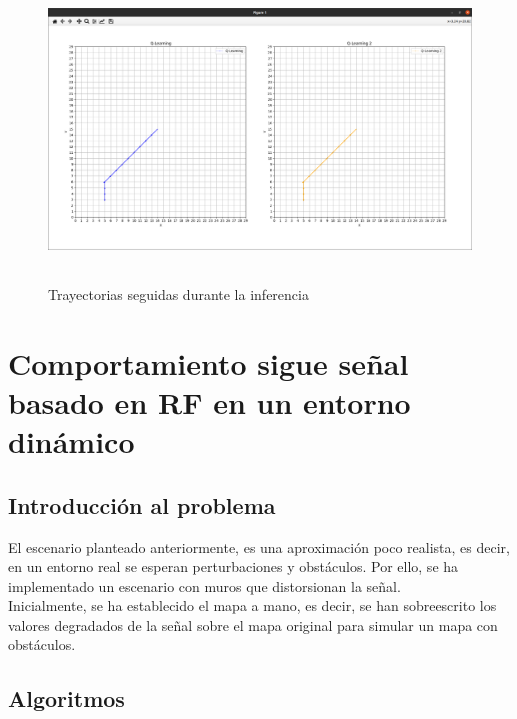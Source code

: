 \begin{figure} [t]
    \begin{center}
    \includegraphics[height=8cm]{imagenes/cap4/13_trayectorias_12.png}
    \end{center}
    \caption[Trayectorias seguidas durante la inferencia]{Trayectorias seguidas durante la inferencia}
    \label{fig:12_traj}
\end{figure}

\section{Comportamiento sigue señal basado en \ac{RF} en un entorno dinámico}
\label{sec:signal_follow_obs}

\subsection{Introducción al problema}
\label{subsec:intro_sfo}

El escenario planteado anteriormente, es una aproximación poco realista, es decir, en un entorno real se esperan perturbaciones y obstáculos. Por ello, se ha implementado un escenario con muros que distorsionan la señal.\\

Inicialmente, se ha establecido el mapa a mano, es decir, se han sobreescrito los valores degradados de la señal sobre el mapa original para simular un mapa con obstáculos.\\

\subsection{Algoritmos}
\label{subsec:algoritmo_sfo}

